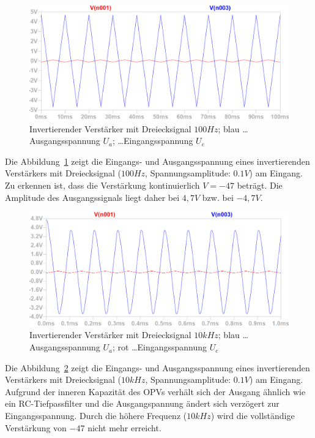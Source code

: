 \documentclass[12pt,a4paper,titlepage]{article}
\begin{document}
\begin{figure}[H]
  \centering
  \includegraphics[width=150mm]{invertierend_dreieck_eingangs_ausgangsspannung}
  \caption{Invertierender Verst\"arker mit Dreiecksignal $100Hz$; blau \dots Ausgangsspannung $U_a$; \dots Eingangsspannung $U_e$}
  \label{figure13}
\end{figure}
Die Abbildung~\ref{figure13} zeigt die Eingangs- und Ausgangsspannung eines invertierenden Verst\"arkers mit Dreiecksignal ($100Hz$, Spannungsamplitude: $0.1V$) am Eingang. Zu erkennen ist, dass die Verst\"arkung kontinuierlich $V = -47$ betr\"agt. Die Amplitude des Ausgangssignals liegt daher bei $4,7V$ bzw. bei $-4,7V$.

\begin{figure}[H]
  \centering
  \includegraphics[width=150mm]{invertierend_dreieck2_eingangs_ausgangsspannung}
  \caption{Invertierender Verst\"arker mit Dreiecksignal $10kHz$; blau \dots Ausgangsspannung $U_a$; rot \dots Eingangsspannung $U_e$}
  \label{figure14}
\end{figure}
Die Abbildung~\ref{figure14} zeigt die Eingangs- und Ausgangsspannung eines invertierenden Verst\"arkers mit Dreiecksignal ($10kHz$, Spannungsamplitude: $0.1V$) am Eingang. Aufgrund der inneren Kapazit\"at des OPVs verh\"alt sich der Ausgang \"ahnlich wie ein RC-Tiefpassfilter und die Ausgangspannung \"andert sich verz\"ogert zur Eingangsspannung. Durch die h\"ohere Frequenz ($10kHz$) wird die vollst\"andige Verst\"arkung von $-47$ nicht mehr erreicht.
\end{document}
